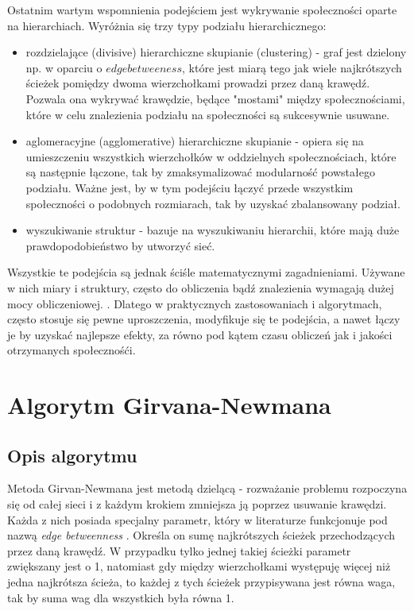 \documentclass{article}
\begin{document}
Ostatnim wartym wspomnienia podejściem jest wykrywanie społeczności oparte na hierarchiach. Wyróżnia się trzy typy podziału hierarchicznego:
\begin{itemize}
\item rozdzielające (divisive) hierarchiczne skupianie (clustering) - graf jest dzielony np. w oparciu o $edge betweeness$, które jest miarą tego jak wiele najkrótszych ścieżek pomiędzy dwoma wierzchołkami prowadzi przez daną krawędź. Pozwala ona wykrywać krawędzie, będące "mostami" między społecznościami, które w celu znalezienia podziału na społeczności są sukcesywnie usuwane.
\item aglomeracyjne (agglomerative) hierarchiczne skupianie - opiera się na umieszczeniu wszystkich wierzchołków w oddzielnych społecznościach, które są następnie łączone, tak by zmaksymalizować modularność powstałego podziału. Ważne jest, by w tym podejściu łączyć przede wszystkim społeczności o podobnych rozmiarach, tak by uzyskać zbalansowany podział.
\item wyszukiwanie struktur - bazuje na wyszukiwaniu hierarchii, które mają duże prawdopodobieństwo by utworzyć sieć.
\end{itemize}

Wszystkie te podejścia są jednak ściśle matematycznymi zagadnieniami. Używane w nich miary i struktury, często do obliczenia bądź znalezienia wymagają dużej mocy obliczeniowej. \cite{pw-paper1}. Dlatego w praktycznych zastosowaniach i algorytmach, często stosuje się pewne uproszczenia, modyfikuje się te podejścia, a nawet łączy je by uzyskać najlepsze efekty, za równo pod kątem czasu obliczeń jak i jakości otrzymanych społecznośći.
\newpage
\section{Algorytm Girvana-Newmana}
\subsection{Opis algorytmu}
Metoda Girvan-Newmana jest metodą dzielącą - rozważanie problemu rozpoczyna się od całej sieci i z każdym krokiem zmniejsza ją poprzez usuwanie krawędzi. Każda z nich posiada specjalny parametr, który w literaturze funkcjonuje pod nazwą \textit{edge betweenness} \cite{is-paper1}. Określa on sumę najkrótszych ścieżek przechodzących przez daną krawędź. W przypadku tylko jednej takiej ścieżki parametr zwiększany jest o 1, natomiast gdy między wierzchołkami występuję więcej niż jedna najkrótsza ścieża, to każdej z tych ścieżek przypisywana jest równa waga, tak by suma wag dla wszystkich była równa 1.
\end{document}
